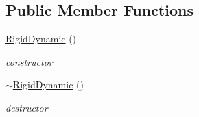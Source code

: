 \subsection*{Public Member Functions}
\begin{DoxyCompactItemize}
\item 
\hypertarget{classContent_1_1Actor_1_1Renderer_1_1RigidDynamic_a9ce0c8e3146b106255c43313c72624ba}{
\hyperlink{classContent_1_1Actor_1_1Renderer_1_1RigidDynamic_a9ce0c8e3146b106255c43313c72624ba}{RigidDynamic} ()}
\label{classContent_1_1Actor_1_1Renderer_1_1RigidDynamic_a9ce0c8e3146b106255c43313c72624ba}

\begin{DoxyCompactList}\small\item\em constructor \item\end{DoxyCompactList}\item 
\hypertarget{classContent_1_1Actor_1_1Renderer_1_1RigidDynamic_a88b34b50964a3207d608da590efaf0a2}{
\hyperlink{classContent_1_1Actor_1_1Renderer_1_1RigidDynamic_a88b34b50964a3207d608da590efaf0a2}{$\sim$RigidDynamic} ()}
\label{classContent_1_1Actor_1_1Renderer_1_1RigidDynamic_a88b34b50964a3207d608da590efaf0a2}

\begin{DoxyCompactList}\small\item\em destructor \item\end{DoxyCompactList}\end{DoxyCompactItemize}
